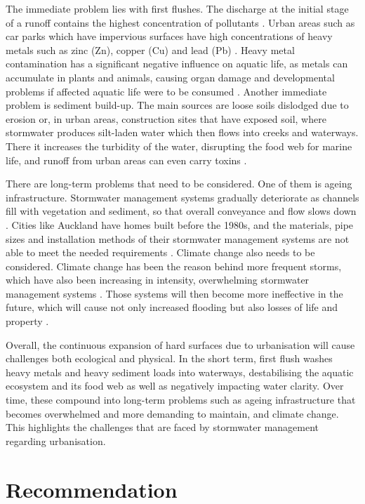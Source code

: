 \documentclass[11pt,a4paper]{article}
\begin{document}
The immediate problem lies with first flushes. The discharge at the initial stage of a runoff contains the highest concentration of pollutants \citep{detsi}. Urban areas such as car parks which have impervious surfaces have high concentrations of heavy metals such as zinc (Zn), copper (Cu) and lead (Pb) \citep{waternz}. Heavy metal contamination has a significant negative influence on aquatic life, as metals can accumulate in plants and animals, causing organ damage and developmental problems if affected aquatic life were to be consumed \citep{heavymetal2024}. Another immediate problem is sediment build-up. The main sources are loose soils dislodged due to erosion or, in urban areas, construction sites that have exposed soil, where stormwater produces silt-laden water which then flows into creeks and waterways. There it increases the turbidity of the water, disrupting the food web for marine life, and runoff from urban areas can even carry toxins \citep{shepherds2022}.

There are long-term problems that need to be considered. One of them is ageing infrastructure. Stormwater management systems gradually deteriorate as channels fill with vegetation and sediment, so that overall conveyance and flow slows down \citep{streamline2026}. Cities like Auckland have homes built before the 1980s, and the materials, pipe sizes and installation methods of their stormwater management systems are not able to meet the needed requirements \citep{akl_homeowner2026}. Climate change also needs to be considered. Climate change has been the reason behind more frequent storms, which have also been increasing in intensity, overwhelming stormwater management systems \citep{stormwater_challenges}. Those systems will then become more ineffective in the future, which will cause not only increased flooding but also losses of life and property \citep{sabut2026}.

Overall, the continuous expansion of hard surfaces due to urbanisation will cause challenges both ecological and physical. In the short term, first flush washes heavy metals and heavy sediment loads into waterways, destabilising the aquatic ecosystem and its food web as well as negatively impacting water clarity. Over time, these compound into long-term problems such as ageing infrastructure that becomes overwhelmed and more demanding to maintain, and climate change. This highlights the challenges that are faced by stormwater management regarding urbanisation.

\section{Recommendation}
\end{document}

